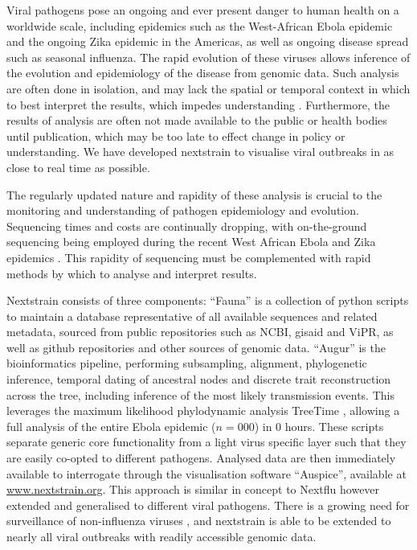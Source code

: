 \documentclass{bioinfo}
\begin{document}
\maketitle

Viral pathogens pose an ongoing and ever present danger to human health on a worldwide scale, including epidemics such as the West-African Ebola epidemic and the ongoing Zika epidemic in the Americas, as well as ongoing disease spread such as seasonal influenza.
The rapid evolution of these viruses allows inference of the evolution and epidemiology of the disease from genomic data.
Such analysis are often done in isolation, and may lack the spatial or temporal context in which to best interpret the results, which impedes understanding \citep{pybus2013evolutionary}.
Furthermore, the results of analysis are often not made available to the public or health bodies until publication, which may be too late to effect change in policy or understanding.
We have developed nextstrain to visualise viral outbreaks in as close to real time as possible.


The regularly updated nature and rapidity of these analysis is crucial to the monitoring and understanding of pathogen epidemiology and evolution.
Sequencing times and costs are continually dropping, with on-the-ground sequencing being employed during the recent West African Ebola and Zika epidemics \citep{quick2016real,faria2017epidemic}.
This rapidity of sequencing must be complemented with rapid methods by which to analyse and interpret results.


Nextstrain consists of three components:
``Fauna'' is a collection of python scripts to maintain a database representative of all available sequences and related metadata, sourced from public repositories such as NCBI, gisaid and ViPR, as well as github repositories and other sources of genomic data. ``Augur'' is the bioinformatics pipeline, performing subsampling, alignment, phylogenetic inference, temporal dating of ancestral nodes and discrete trait reconstruction across the tree, including inference of the most likely transmission events.
This leverages the maximum likelihood phylodynamic analysis TreeTime \citep{sagulenko2017treetime}, allowing a full analysis of the entire Ebola epidemic ($n=000$) in 0 hours.
These scripts separate generic core functionality from a light virus specific layer such that they are easily co-opted to different pathogens.
Analysed data are then immediately available to interrogate through the visualisation software ``Auspice'', available at \href{www.nextstrain.org}{www.nextstrain.org}.
This approach is similar in concept to Nextflu \citep{neher2015nextflu} however extended and generalised to different viral pathogens.
There is a growing need for surveillance of non-influenza viruses \citep{tang2017global}, and nextstrain is able to be extended to nearly all viral outbreaks with readily accessible genomic data.
\end{document}
